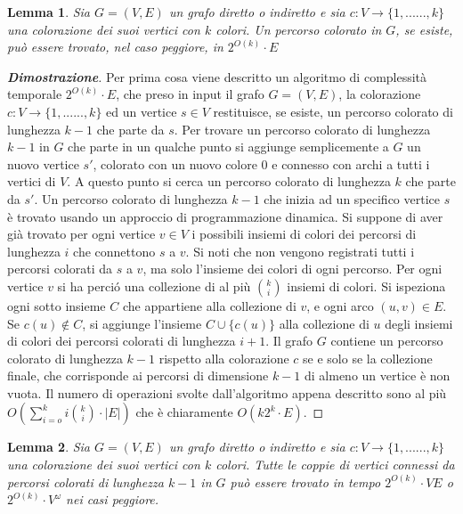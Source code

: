 \newtheorem{lemma}{Lemma}[section]
\newtheorem{teorema}[lemma]{Teorema}
\begin{lemma}
	\label{lemma1}
	Sia $G=(V,E)$ un grafo diretto o indiretto e sia $c:V\rightarrow\{1,......,k\}$ una colorazione dei suoi vertici con $k$ colori. Un percorso colorato in $G$, se esiste, pu\`o essere trovato, nel caso peggiore, in $2^{O(k)} \cdot E$
\end{lemma}
\begin{proof}[\textbf{Dimostrazione}]

	Per prima cosa viene descritto un algoritmo di complessit\`a temporale $2^{O(k)} \cdot E$, che preso in input il grafo $G=(V,E)$, la colorazione $c:V\rightarrow\{1,......,k\}$ ed un vertice $s\in{V}$ restituisce, se esiste, un percorso colorato di lunghezza $k-1$ che parte da $s$.
	Per trovare un percorso colorato di lunghezza $k-1$ in $G$ che parte in un qualche punto si aggiunge semplicemente a $G$  un nuovo vertice $s'$, colorato con un nuovo colore $0$ e connesso con archi a tutti i vertici di $V$. A questo punto si cerca un percorso colorato di lunghezza $k$ che parte da $s'$.
	Un percorso colorato di lunghezza $k-1$ che inizia ad un specifico vertice $s$ \`e trovato usando un approccio di programmazione dinamica.
	Si suppone di aver gi\`a trovato per ogni vertice $v\in{V}$ i possibili insiemi di colori dei percorsi di lunghezza $i$ che connettono $s$ a $v$.
	Si noti che non vengono registrati tutti i percorsi colorati da $s$ a $v$, ma solo l'insieme dei colori di ogni percorso.
	Per ogni vertice $v$ si ha perci\'o una collezione di al pi\`u $\binom {k}{i}$ insiemi di colori.
	Si ispeziona ogni sotto insieme $C$ che appartiene alla collezione di $v$, e ogni arco $(u,v)\in{E}$. 
	Se $c(u)\notin{C}$, si aggiunge l'insieme $C\cup\{c(u)\}$ alla collezione di $u$ degli insiemi di colori dei percorsi colorati di lunghezza $i+1$.
	Il grafo $G$ contiene un percorso colorato di lunghezza $k-1$ rispetto alla colorazione $c$ se e solo se la collezione finale, che corrisponde ai percorsi di dimensione $k-1$ di almeno un vertice \`e non vuota.
	Il numero di operazioni svolte dall'algoritmo appena descritto sono al pi\`u $O(\sum_{i=o}^{k} i \binom{k}{i} \cdot |E|)$ che \`e chiaramente $O(k2^{k}\cdot{E})$.
\end{proof}

\begin{lemma}
	\label{lemma2}
	Sia $G=(V,E)$ un grafo diretto o indiretto e sia $c:V\rightarrow\{1,......,k\}$ una colorazione dei suoi vertici con $k$ colori. Tutte le coppie di vertici connessi da percorsi colorati di lunghezza $k-1$ in $G$ pu\`o essere trovato in tempo $2^{O(k)} \cdot{VE}$ o $2^{O(k)}\cdot {V^{\omega}}$ nei casi peggiore.
\end{lemma}

